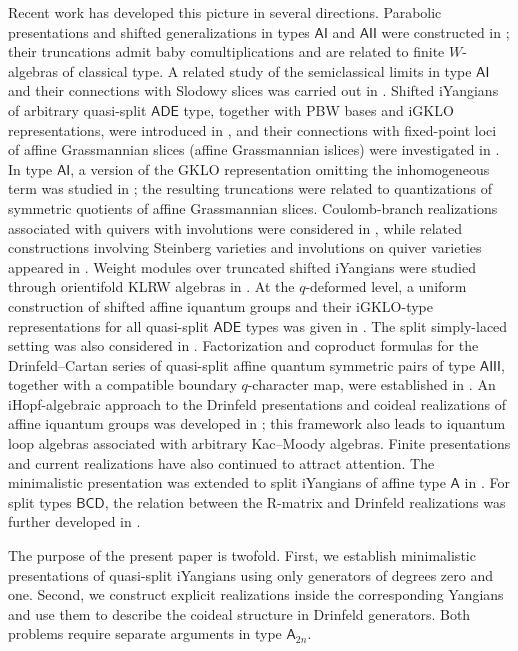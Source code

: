 \documentclass[11pt,reqno]{amsart}
\numberwithin{equation}{section}
\theoremstyle{definition}
\theoremstyle{remark}
\begin{document}
Recent work has developed this picture in several directions. Parabolic presentations and shifted generalizations in types $\mathsf{AI}$ and $\mathsf{AII}$ were constructed in \cite{LPTTW25}; their truncations admit baby comultiplications and are related to finite $W$-algebras of classical type. A related study of the semiclassical limits in type $\mathsf{AI}$ and their connections with Slodowy slices was carried out in \cite{TT24}. Shifted iYangians of arbitrary quasi-split $\mathsf{ADE}$ type, together with PBW bases and iGKLO representations, were introduced in \cite{LWW25SiY}, and their connections with fixed-point loci of affine Grassmannian slices (affine Grassmannian islices) were investigated in \cite{LWW25}. In type $\mathsf{AI}$, a version of the GKLO representation omitting the inhomogeneous term was studied in \cite{BPT25}; the resulting truncations were related to quantizations of symmetric quotients of affine Grassmannian slices. Coulomb-branch realizations associated with quivers with involutions were considered in \cite{SSX25,wang2025quivers,SSX26}, while related constructions involving Steinberg varieties and involutions on quiver varieties appeared in \cite{Li19,su2026twisted,Nak25}. Weight modules over truncated shifted iYangians were studied through orientifold KLRW algebras in \cite{shen2026weight}. At the $q$-deformed level, a uniform construction of shifted affine iquantum groups and their iGKLO-type representations for all quasi-split $\mathsf{ADE}$ types was given in \cite{LWW26affine}. The split simply-laced setting was also considered in \cite{LP26GKLO}. Factorization and coproduct formulas for the Drinfeld--Cartan series of quasi-split affine quantum symmetric pairs of type $\mathsf{AIII}$, together with a compatible boundary $q$-character map, were established in \cite{LP26qchar}. An iHopf-algebraic approach to the Drinfeld presentations and
coideal realizations of affine iquantum groups was developed in
\cite{LuPan26Drinfeld}; this framework also leads to iquantum loop
algebras associated with arbitrary Kac--Moody algebras. Finite presentations and current realizations have also continued to attract attention. The minimalistic presentation was extended to split iYangians of affine type $\mathsf A$ in \cite{Ueda25twistedaffine}. For split types $\mathsf{BCD}$, the relation between the R-matrix and Drinfeld realizations was further developed in \cite{regelskis2026twisted}.


The purpose of the present paper is twofold. First, we establish minimalistic presentations of quasi-split iYangians using only generators of degrees zero and one. Second, we construct explicit realizations inside the corresponding Yangians and use them to describe the coideal structure in Drinfeld generators. Both problems require separate arguments in type $\mathsf A_{2n}$.
\end{document}
